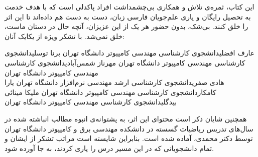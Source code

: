 \newpage
\thispagestyle{empty}

\scriptsize{
\p
این کتاب، ثمره‌ی تلاش و همکاری بی‌چشمداشت افراد پاکدلی است
که با هدف خدمت به تحصیل رایگان و یاری علم‌جویان فارسی زبان،
دست به دست هم داده‌اند تا این اثر را خلق کنند.
بی‌شک، بدون حضور هر یک از این عزیزان، آنچه حال در دستان ماست،
خلق نمی‌شد. با تشکر ویژه از یکایک آنان:
}

\scriptsize{
    \begin{AFFILIATIONS}
        \AFFILIATIONROW
        {عارف افضلی}{دانشجوی کارشناسی مهندسی کامپیوتر دانشگاه تهران}{}
        {برنا توسلی}{دانشجوی کارشناسی مهندسی کامپیوتر دانشگاه تهران}{}
        {مهرناز شمس‌آبادی}{دانشجوی کارشناسی مهندسی کامپیوتر دانشگاه تهران}{}
        \\\AFFILIATIONROW
        {هادی صفری}{دانشجوی کارشناسی ارشد مهندسی نرم‌افزار دانشگاه تهران}{}
        {یارا کامکار}{دانشجوی کارشناسی مهندسی کامپیوتر دانشگاه تهران}{}
        {ملیکا مینائی بیدگلی}{دانشجوی کارشناسی مهندسی کامپیوتر دانشگاه تهران}{}
    \end{AFFILIATIONS}
}

\scriptsize{
\p
همچنین شایان ذکر است محتوای این اثر،
به پشتوانه‌ی انبوه مطالب انباشته شده در سال‌های تدریس ریاضیات گسسته
در دانشکده مهندسی برق و کامپیوتر دانشگاه تهران
توسط دکتر محمدی، آماده شده است.
بنابراین شایسته است مراتب تشکر از ایشان و تمام دانشجویانی که در این مسیر
درس را یاری کردند، به جا آورده شود.
}